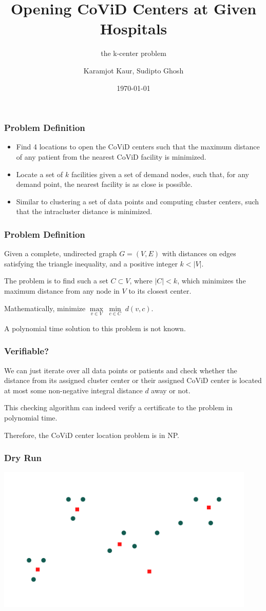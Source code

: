 \documentclass{beamer}
\title{Opening CoViD Centers at Given Hospitals}
\subtitle{the k-center problem}
\author{Karamjot Kaur, Sudipto Ghosh}
\institute{\emph{M.Sc. CS Semester I\\Department of Computer Science\\University of Delhi}}
\date{\today}
\begin{document}
\begin{frame}
    \titlepage
\end{frame}

\begin{frame}
    \frametitle{Problem Definition}
    \begin{itemize}
        \item Find 4 locations to open the CoViD centers such that the maximum distance of any patient from the nearest CoViD facility is minimized.
        \item Locate a set of $k$ facilities given a set of demand nodes, such that, for any demand point, the nearest facility is as close is possible.
        \item Similar to clustering a set of data points and computing cluster centers, such that the intracluster distance is minimized.
    \end{itemize}
\end{frame}

\begin{frame}
    \frametitle{Problem Definition}
    Given a complete, undirected graph $G = (V, E)$ with distances on edges satisfying the triangle inequality, and a positive integer $k < |V|$.
    
    The problem is to find such a set $C \subset V$, where $|C| < k$, which minimizes the maximum distance from any node in $V$ to its closest center.
    
    Mathematically, minimize $\underset{v \in V}{\max}\;\underset{c \in C}{\min}\;d(v,c)$.
    
    A polynomial time solution to this problem is not known.
\end{frame}

\begin{frame}
    \frametitle{Verifiable?}
    We can just iterate over all data points or patients and check whether the distance from its assigned cluster center or their assigned CoViD center is located at most some non-negative integral distance $d$ away or not.
    
    This checking algorithm can indeed verify a certificate to the problem in polynomial time.
    
    Therefore, the CoViD center location problem is in NP.
\end{frame}

\begin{frame}[c]
    \frametitle{Dry Run}
    \centering \includegraphics[width=350pt]{./5.png}
\end{frame}
\end{document}
